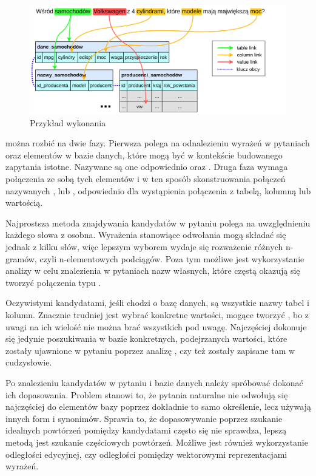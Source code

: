 \begin{figure}[ht!]
  \centering
  \includegraphics[width=1.0\linewidth]{images/schema_linking.png}
  \caption{Przykład wykonania }
  \label{fig:schema-linking}
\end{figure}

 można rozbić na dwie fazy. Pierwsza polega na odnalezieniu wyrażeń w pytaniach oraz elementów w bazie danych, które mogą być w kontekście budowanego zapytania istotne. Nazywane są one odpowiednio  oraz . Druga faza  wymaga połączenia ze sobą tych elementów i w ten sposób skonstruowania połączeń nazywanych ,  lub , odpowiednio dla wystąpienia połączenia z tabelą, kolumną lub wartością.


Najprostsza metoda znajdywania kandydatów w pytaniu polega na uwzględnieniu każdego słowa z osobna. Wyrażenia stanowiące odwołania mogą składać się jednak z kilku słów, więc lepszym wyborem wydaje się rozważenie różnych n-gramów, czyli n-elementowych podciągów. Poza tym możliwe jest wykorzystanie analizy  w celu znalezienia w pytaniach nazw własnych, które częstą okazują się tworzyć połączenia typu .

Oczywistymi kandydatami, jeśli chodzi o bazę danych, są wszystkie nazwy tabel i kolumn. Znacznie trudniej jest wybrać konkretne wartości, mogące tworzyć , bo z uwagi na ich wielość nie można brać wszystkich pod uwagę. Najczęściej dokonuje się jedynie poszukiwania w bazie konkretnych, podejrzanych wartości, które zostały ujawnione w pytaniu poprzez analizę , czy też zostały zapisane tam w cudzysłowie.

Po znalezieniu kandydatów w pytaniu i bazie danych należy spróbować dokonać ich dopasowania. Problem stanowi to, że pytania naturalne nie odwołują się najczęściej do elementów bazy poprzez dokładnie to samo określenie, lecz używają innych form i synonimów. Sprawia to, że dopasowywanie poprzez szukanie idealnych powtórzeń pomiędzy kandydatami często się nie sprawdza, lepszą metodą jest szukanie częściowych powtórzeń. Możliwe jest również wykorzystanie odległości edycyjnej, czy odległości pomiędzy wektorowymi reprezentacjami wyrażeń.

